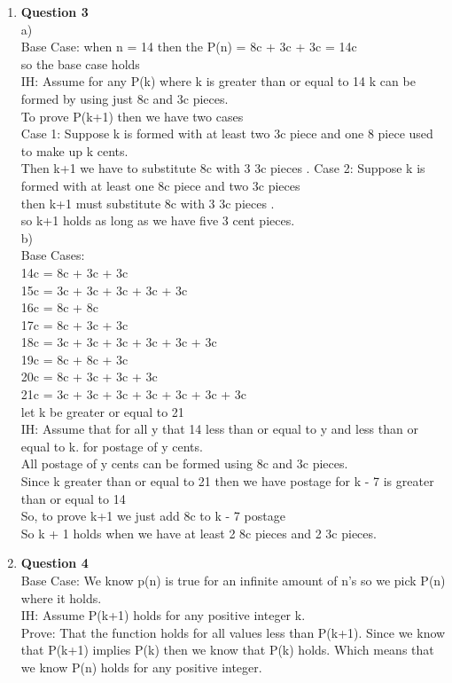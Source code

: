 \documentclass[12pt]{article}
\begin{document}
\begin{enumerate}
\item {\bf Question 3} \\
a) \\
Base Case: when n = 14 then the P(n) = 8c + 3c + 3c = 14c \\
so the base case holds \\
IH: Assume for any P(k) where k is greater than or equal to 14 k can be formed by using just 8c and 3c pieces. \\
To prove P(k+1) then we have two cases \\
Case 1: Suppose k is formed with at least two 3c piece and one 8 piece used to make up k cents. \\
Then k+1  we have to substitute 8c with 3 3c pieces . 
Case 2: Suppose k is formed with at least one 8c piece and two 3c pieces \\
then k+1 must substitute 8c with 3 3c pieces .\\
so k+1 holds as long as we have five 3 cent pieces. \\
b) \\
Base Cases: \\
	14c = 8c + 3c + 3c \\
	15c = 3c + 3c + 3c + 3c + 3c  \\
	16c = 8c + 8c  \\
	17c = 8c + 3c + 3c \\
	18c = 3c + 3c + 3c + 3c + 3c + 3c \\
	19c = 8c + 8c + 3c \\
	20c = 8c + 3c + 3c + 3c \\
	21c = 3c + 3c + 3c + 3c + 3c + 3c + 3c \\
	let k be greater or equal to 21  \\
IH:
	Assume that for all y that 14 less than or equal to y and less than or equal to k. for postage of y cents. \\
	All postage of y cents can be formed using 8c and 3c pieces. \\
	Since k greater than or equal to 21 then we have postage for k - 7 is greater than or equal to 14 \\
	So, to prove k+1 we just add 8c to k - 7 postage \\
	So k + 1 holds when we have at least 2 8c pieces and 2 3c pieces. \\ 


\item {\bf Question 4} \\
Base Case: We know p(n) is true for an infinite amount of n's so we pick P(n) where it holds. \\
IH: Assume P(k+1) holds for any positive integer k.\\
Prove: That the function holds for all values less than P(k+1). Since we know that P(k+1) implies P(k) then we know that P(k) holds. Which means that we know P(n) holds for any positive integer. 


\end{enumerate}
\end{document}
